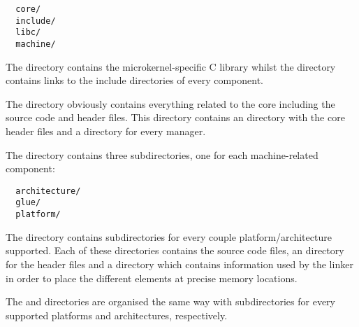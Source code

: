 \begin{verbatim}
  core/
  include/
  libc/
  machine/
\end{verbatim}

The  directory contains the microkernel-specific C library
whilst the  directory contains links to the include
directories of every component.

The  directory obviously contains everything related to the
core including the source code and header files. This directory contains
an  directory with the core header files and a directory
for every manager.

The  directory contains three subdirectories, one for each
machine-related component:

\begin{verbatim}
  architecture/
  glue/
  platform/
\end{verbatim}

The  directory contains subdirectories for every couple
platform/architecture supported. Each of these directories contains the
source code files, an  directory for the header files and
a  directory which contains information used by the linker
in order to place the different elements at precise memory locations.

The  and  directories are organised
the same way with subdirectories for every supported platforms and
architectures, respectively.
